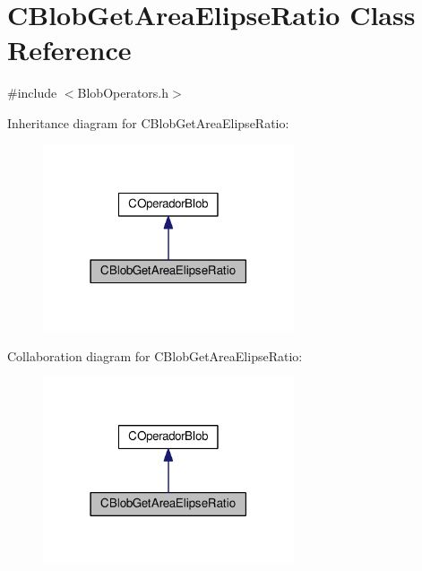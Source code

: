 \hypertarget{classCBlobGetAreaElipseRatio}{\section{C\-Blob\-Get\-Area\-Elipse\-Ratio Class Reference}
\label{classCBlobGetAreaElipseRatio}
}


{\ttfamily \#include $<$Blob\-Operators.\-h$>$}



Inheritance diagram for C\-Blob\-Get\-Area\-Elipse\-Ratio\-:\nopagebreak
\begin{figure}[H]
\begin{center}
\leavevmode
\includegraphics[width=210pt]{classCBlobGetAreaElipseRatio__inherit__graph}
\end{center}
\end{figure}


Collaboration diagram for C\-Blob\-Get\-Area\-Elipse\-Ratio\-:\nopagebreak
\begin{figure}[H]
\begin{center}
\leavevmode
\includegraphics[width=210pt]{classCBlobGetAreaElipseRatio__coll__graph}
\end{center}
\end{figure}

